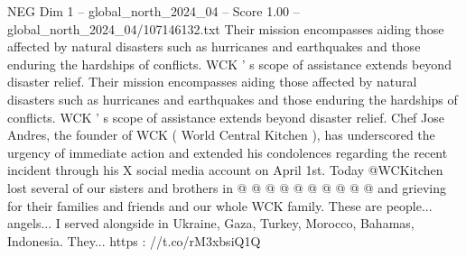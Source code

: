 \begin{textsample}{NEG Dim 1 – global\_north\_2024\_04 – Score 1.00 – global\_north\_2024\_04/107146132.txt}
Their mission encompasses aiding those affected by natural disasters such as hurricanes and earthquakes and those enduring the hardships of conflicts.
WCK ' s scope of assistance extends beyond disaster relief.
Their mission encompasses aiding those affected by natural disasters such as hurricanes and earthquakes and those enduring the hardships of conflicts.
WCK ' s scope of assistance extends beyond disaster relief.
Chef Jose Andres, the founder of WCK ( World Central Kitchen ), has underscored the urgency of immediate action and extended his condolences regarding the recent incident through his X social media account on April 1st.
Today @WCKitchen lost several of our sisters and brothers in @ @ @ @ @ @ @ @ @ @ and grieving for their families and friends and our whole WCK family.
These are people... angels...
I served alongside in Ukraine, Gaza, Turkey, Morocco, Bahamas, Indonesia.
They... https : //t.co/rM3xbsiQ1Q

\end{textsample}
